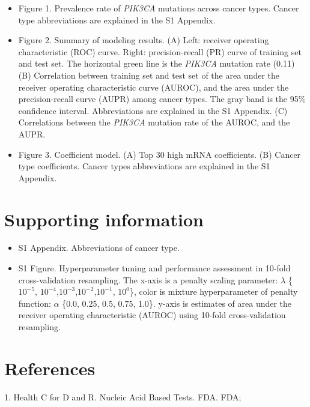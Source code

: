 \documentclass[10pt,letterpaper]{article}
\providecommand{\tightlist}{%
  \setlength{\itemsep}{0pt}\setlength{\parskip}{0pt}}
\begin{document}
\begin{itemize}
\item
  Figure 1. Prevalence rate of \emph{PIK3CA} mutations across cancer
  types. Cancer type abbreviations are explained in the S1 Appendix.
\item
  Figure 2. Summary of modeling results. (A) Left: receiver operating
  characteristic (ROC) curve. Right: precision-recall (PR) curve of
  training set and test set. The horizontal green line is the
  \emph{PIK3CA} mutation rate (0.11) (B) Correlation between training
  set and test set of the area under the receiver operating
  characteristic curve (AUROC), and the area under the precision-recall
  curve (AUPR) among cancer types. The gray band is the 95\% confidence
  interval. Abbreviations are explained in the S1 Appendix. (C)
  Correlations between the \emph{PIK3CA} mutation rate of the AUROC, and
  the AUPR.
\item
  Figure 3. Coefficient model. (A) Top 30 high mRNA coefficients. (B)
  Cancer type coefficients. Cancer types abbreviations are explained in
  the S1 Appendix.
\end{itemize}

\hypertarget{supporting-information}{%
\section{Supporting information}\label{supporting-information}}

\begin{itemize}
\tightlist
\item
  S1 Appendix. Abbreviations of cancer type.\\
\item
  S1 Figure. Hyperparameter tuning and performance assessment in 10-fold
  cross-validation resampling. The x-axis is a penalty scaling
  parameter: \(\lambda\) \{\(10^{-5}\),
  \(10^{-4}\),\(10^{-3}\),\(10^{-2}\),\(10^{-1}\), \(10^{0}\)\}, color
  is mixture hyperparameter of penalty function: \(\alpha\) \{0.0, 0.25,
  0.5, 0.75, 1.0\}. y-axis is estimates of area under the receiver
  operating characteristic (AUROC) using 10-fold cross-validation
  resampling.
\end{itemize}

\hypertarget{references}{%
\section{References}\label{references}}

\hypertarget{refs}{}
\leavevmode\hypertarget{ref-healthNucleicAcidBased2020}{}%
1. Health C for D and R. Nucleic Acid Based Tests. FDA. FDA;
\end{document}
